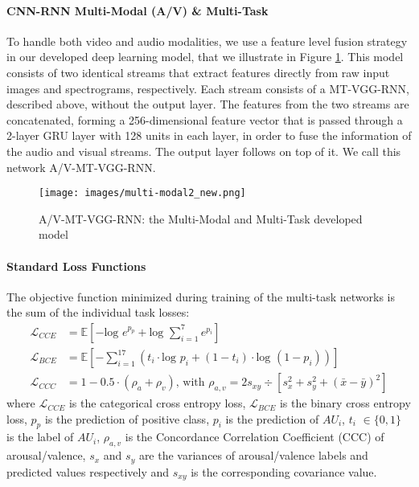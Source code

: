 \documentclass{bmvc2k}
\begin{document}
\paragraph{CNN-RNN Multi-Modal (A/V) \& Multi-Task} 
To handle both video and audio modalities, we use a feature level fusion strategy in our  developed deep learning model, that we illustrate in Figure \ref{multi-modal}. This model consists of two identical streams that extract features directly from raw input images and spectrograms, respectively. Each stream consists of a MT-VGG-RNN, described above, without the output layer. The features from the two streams are concatenated, forming a 256-dimensional feature vector that is passed through a 2-layer GRU layer with 128 units in each layer, in order to fuse the information of the audio and visual streams. The output layer follows on top of it. We call this network A/V-MT-VGG-RNN.


\begin{figure}[h]
\centering
 \texttt{[image: images/multi-modal2\_new.png]} 
\caption{A/V-MT-VGG-RNN: the Multi-Modal and Multi-Task developed model}
\label{multi-modal}
\end{figure}


\paragraph{Standard Loss Functions} 
The objective function minimized during training of the multi-task networks is the sum of the individual task losses:
\vspace*{-4px}
\begin{align}
\mathcal{L}_{CCE} &= \mathbb{E}[-\text{log } e^{p_p} + \text{log } \sum\nolimits_{i=1}^{7}{e^{p_i}} ]
\label{eq:cce}\\
\mathcal{L}_{BCE} &= \mathbb{E}[ -\sum\nolimits_{i=1}^{17}{(t_i \cdot \text{log } p_i + (1-t_i) \cdot \text{log } (1 -p_i))}] 
\label{eq:bce}\\
\mathcal{L}_{CCC} &= 1- 0.5 \cdot (\rho_a + \rho_v) \text{, with } \rho_{a,v} =  2 s_{xy} \div [s_x^2 + s_y^2 + (\bar{x} - \bar{y})^2] 
\label{eq:ccc}
\end{align}
where $\mathcal{L}_{CCE}$ is the categorical cross entropy loss, $\mathcal{L}_{BCE}$ is the binary cross entropy loss,  $p_p$  is the prediction of positive class, $p_i$ is the prediction of $AU_i$,  $t_i$ $\in \{0,1\}$ is the label of $AU_i$, $\rho_{a,v}$ is the Concordance Correlation Coefficient (CCC) of arousal/valence, $s_x$ and $s_y$ are the variances of arousal/valence labels and predicted values respectively and $s_{xy}$ is the corresponding covariance value. 
\end{document}
